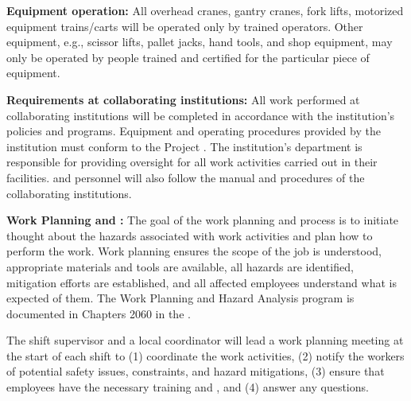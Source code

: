 {\bf Equipment operation:} All overhead cranes, gantry cranes, fork lifts, motorized equipment trains/carts will be operated only by trained  operators. 
Other equipment, e.g., scissor lifts, pallet jacks, hand tools, and shop equipment, may only be operated by people trained
and certified for the particular piece of equipment.

{\bf Requirements at collaborating %
institutions:} All work performed at collaborating institutions will be completed in accordance with the %
institution's  policies and programs. 
Equipment and operating procedures provided by the %
institution must conform to the  Project . %
The %
institution's  department is responsible for providing   oversight for all work activities carried out in their facilities. %
 and  personnel will also follow the  manual and procedures of the collaborating institutions.


{\bf Work Planning and :} The goal of the work planning and  process is to initiate thought about the hazards associated with work activities and plan how to perform the work. Work planning ensures the scope of the job is understood, appropriate materials and tools are available, all hazards are identified, mitigation efforts are established, and all affected employees understand what is expected of them. 
The Work Planning and Hazard Analysis program is documented in Chapters 2060 in the .

The shift supervisor and a local  coordinator  will lead a work planning meeting at the start of each shift  to (1) coordinate the work activities, (2) notify the workers of potential safety issues, constraints, and hazard mitigations, (3) ensure that employees have the necessary  training and , and (4) answer any questions.

 






   




